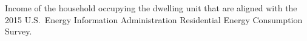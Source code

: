 Income of the household occupying the dwelling unit that are aligned with the 2015 U.S.~Energy Information Administration Residential Energy Consumption Survey.
